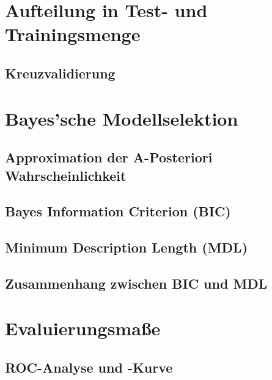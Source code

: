 
	\section{Aufteilung in Test- und Trainingsmenge} %

		\subsection{Kreuzvalidierung} %

	\section{Bayes'sche Modellselektion} %

		\subsection{Approximation der A-Posteriori Wahrscheinlichkeit} %

		\subsection{Bayes Information Criterion (BIC)} %

		\subsection{Minimum Description Length (MDL)} %

		\subsection{Zusammenhang zwischen BIC und MDL} %

	\section{Evaluierungsmaße} %

		\subsection{ROC-Analyse und -Kurve} %

